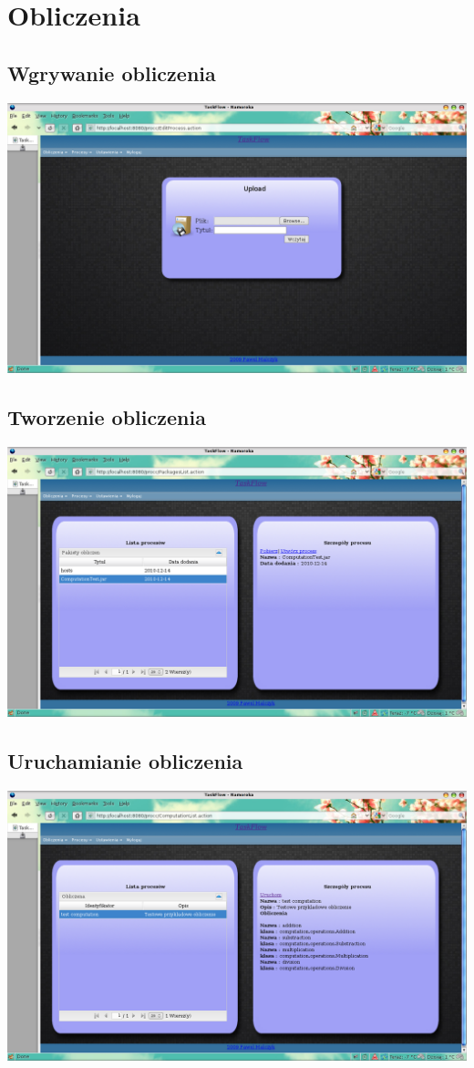 \documentclass{article}
\begin{document}
\section{Obliczenia}

\subsection{Wgrywanie obliczenia}
\includegraphics[scale=0.4]{img/prc1.png}

\subsection{Tworzenie obliczenia}
\includegraphics[scale=0.4]{img/prc2.png}

\subsection{Uruchamianie obliczenia}
\includegraphics[scale=0.4]{img/prc3.png}
\end{document}
